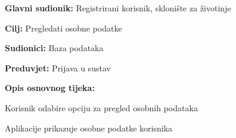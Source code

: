 					\noindent {}
					\begin{packed_item}
	
						\item \textbf{Glavni sudionik:} Registrirani korisnik, sklonište za životinje
						\item  \textbf{Cilj:} Pregledati osobne podatke
						\item  \textbf{Sudionici:} Baza podataka
						\item  \textbf{Preduvjet:} Prijava u sustav
						\item  \textbf{Opis osnovnog tijeka:}
						
						\item[] \begin{packed_enum}
	
							\item Korisnik odabire opciju za pregled osobnih podataka
							\item Aplikacije prikazuje osobne podatke korisnika
						\end{packed_enum}
					\end{packed_item}
					
